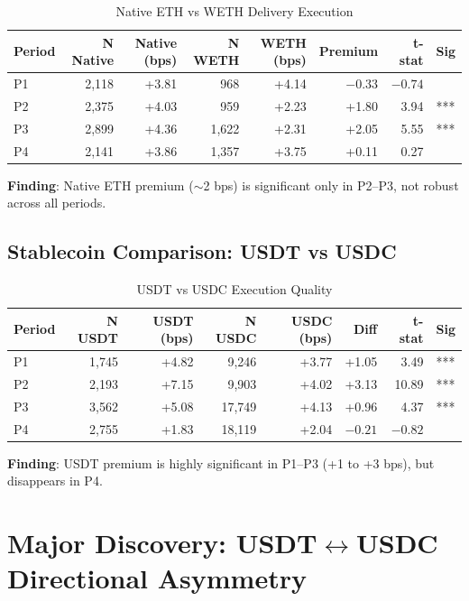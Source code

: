 \documentclass[11pt,a4paper]{article}
\begin{document}
\begin{table}[H]
\centering
\caption{Native ETH vs WETH Delivery Execution}
\begin{tabular}{lrrrrrrl}
\toprule
\textbf{Period} & \textbf{N Native} & \textbf{Native (bps)} & \textbf{N WETH} & \textbf{WETH (bps)} & \textbf{Premium} & \textbf{t-stat} & \textbf{Sig} \\
\midrule
P1 & 2,118 & +3.81 & 968 & +4.14 & $-0.33$ & $-0.74$ & \\
P2 & 2,375 & +4.03 & 959 & +2.23 & +1.80 & 3.94 & *** \\
P3 & 2,899 & +4.36 & 1,622 & +2.31 & +2.05 & 5.55 & *** \\
P4 & 2,141 & +3.86 & 1,357 & +3.75 & +0.11 & 0.27 & \\
\bottomrule
\end{tabular}
\end{table}

\textbf{Finding}: Native ETH premium ($\sim$2 bps) is significant only in P2--P3, not robust across all periods.

\subsection{Stablecoin Comparison: USDT vs USDC}

\begin{table}[H]
\centering
\caption{USDT vs USDC Execution Quality}
\begin{tabular}{lrrrrrrl}
\toprule
\textbf{Period} & \textbf{N USDT} & \textbf{USDT (bps)} & \textbf{N USDC} & \textbf{USDC (bps)} & \textbf{Diff} & \textbf{t-stat} & \textbf{Sig} \\
\midrule
P1 & 1,745 & +4.82 & 9,246 & +3.77 & +1.05 & 3.49 & *** \\
P2 & 2,193 & +7.15 & 9,903 & +4.02 & +3.13 & 10.89 & *** \\
P3 & 3,562 & +5.08 & 17,749 & +4.13 & +0.96 & 4.37 & *** \\
P4 & 2,755 & +1.83 & 18,119 & +2.04 & $-0.21$ & $-0.82$ & \\
\bottomrule
\end{tabular}
\end{table}

\textbf{Finding}: USDT premium is highly significant in P1--P3 (+1 to +3 bps), but disappears in P4.

\section{Major Discovery: USDT$\leftrightarrow$USDC Directional Asymmetry}
\end{document}
